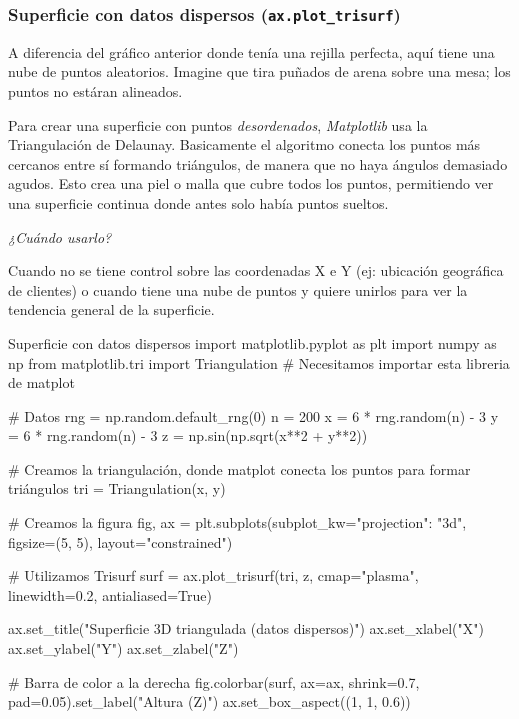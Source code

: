 \subsubsection{Superficie con datos dispersos (\texttt{ax.plot\_trisurf})}

A diferencia del gráfico anterior donde tenía una rejilla perfecta, aquí tiene una nube de puntos aleatorios. Imagine que tira puñados de arena sobre una mesa; los puntos no estáran alineados.    

Para crear una superficie con puntos \textit{desordenados}, \textit{Matplotlib} usa la Triangulación de Delaunay. Basicamente el algoritmo conecta los puntos más cercanos entre sí formando triángulos, de manera que no haya ángulos demasiado agudos. Esto crea una piel o malla que cubre todos los puntos, permitiendo ver una superficie continua donde antes solo había puntos sueltos.

\emph{¿Cuándo usarlo?}

Cuando no se tiene control sobre las coordenadas X e Y (ej: ubicación geográfica de clientes) o cuando tiene una nube de puntos y quiere unirlos para ver la tendencia general de la superficie.

\begin{pycode}{Superficie con datos dispersos}
import matplotlib.pyplot as plt
import numpy as np
from matplotlib.tri import Triangulation # Necesitamos importar esta libreria de matplot

# Datos
rng = np.random.default_rng(0)
n = 200
x = 6 * rng.random(n) - 3
y = 6 * rng.random(n) - 3
z = np.sin(np.sqrt(x**2 + y**2))

# Creamos la triangulación, donde matplot conecta los puntos para formar triángulos
tri = Triangulation(x, y)

# Creamos la figura 
fig, ax = plt.subplots(subplot_kw={"projection": "3d"}, figsize=(5, 5), layout="constrained")

# Utilizamos Trisurf
surf = ax.plot_trisurf(tri, z, cmap="plasma", linewidth=0.2, antialiased=True)

ax.set_title("Superficie 3D triangulada (datos dispersos)")
ax.set_xlabel("X")
ax.set_ylabel("Y")
ax.set_zlabel("Z")

# Barra de color a la derecha
fig.colorbar(surf, ax=ax, shrink=0.7, pad=0.05).set_label("Altura (Z)")
ax.set_box_aspect((1, 1, 0.6))
\end{pycode}

